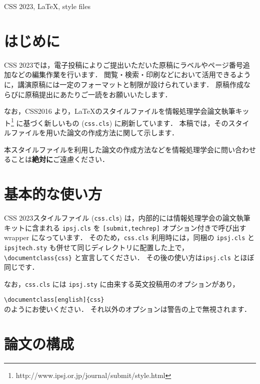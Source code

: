 \documentclass{css}
\def\|{\verb|}
\newcommand{\cssname}[0]{CSS 2023}
\begin{document}
\begin{ekeyword}
	\cssname, \LaTeX, style files
\end{ekeyword}

%% if you use english opsion, you should put your English abstract in the abstract environment.
%% eabstract is not displayed in english mode.

\maketitle

%1
\section{はじめに}

\cssname では，電子投稿によりご提出いただいた原稿にラベルやページ番号追加などの編集作業を行います．
閲覧・検索・印刷などにおいて活用できるように，講演原稿には一定のフォーマットと制限が設けられています．
原稿作成ならびに原稿提出にあたりご一読をお願いいたします．

なお，CSS2016 より，\LaTeX のスタイルファイルを情報処理学会論文執筆キット\footnote{http://www.ipsj.or.jp/journal/submit/style.html} に基づく新しいもの (\|css.cls|) に刷新しています．
本稿では，そのスタイルファイルを用いた論文の作成方法に関して示します．

本スタイルファイルを利用した論文の作成方法などを情報処理学会に問い合わせることは\textbf{絶対に}ご遠慮ください．

\section{基本的な使い方}

\cssname スタイルファイル (\|css.cls|) は，内部的には情報処理学会の論文執筆キットに含まれる \|ipsj.cls| を \|[submit,techrep]| オプション付きで呼び出す wrapper になっています．
そのため，\|css.cls| 利用時には，同梱の \|ipsj.cls| と \|ipsjtech.sty| も併せて同じディレクトリに配置した上で，\|\documentclass{css}| と宣言してください．
その後の使い方は\|ipsj.cls| とほぼ同じです．

なお，\|css.cls| には \|ipsj.sty| に由来する英文投稿用のオプションがあり，

\noindent
\|\documentclass[english]{css} |\\
のようにお使いください．
それ以外のオプションは警告の上で無視されます．

\section{論文の構成}
\end{document}
